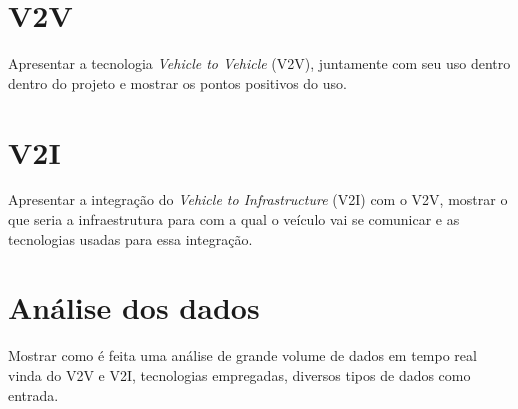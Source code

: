 \section{V2V}
\label{sec:v2v}
Apresentar a tecnologia \textit{Vehicle to Vehicle} (V2V), juntamente com seu uso dentro dentro do projeto e mostrar os pontos positivos do uso.

\section{V2I}
\label{sec:v2i}
Apresentar a integração do \textit{Vehicle to Infrastructure} (V2I) com o V2V, mostrar o que seria a infraestrutura para com a qual o veículo vai se comunicar e as tecnologias usadas para essa integração.

\section{Análise dos dados}
\label{sec:analisedados}
Mostrar como é feita uma análise de grande volume de dados em tempo real vinda do V2V e V2I, tecnologias empregadas, diversos tipos de dados como entrada.


 